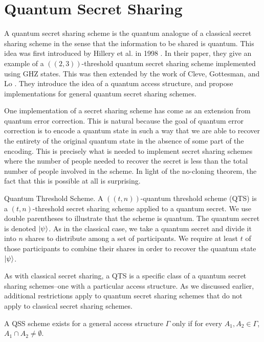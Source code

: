 \section{Quantum Secret Sharing}
\label{section:qss}

A quantum secret sharing scheme is the quantum analogue of a classical secret sharing scheme in the sense that the information to be shared is quantum. This idea was first introduced by Hillery et al. in 1998 \cite{hillery_quantum_1999}. In their paper, they give an example of a $((2,3))$-threshold quantum secret sharing scheme implemented using GHZ states. This was then extended by the work of Cleve, Gottesman, and Lo \cite{cleve_how_1999}. They introduce the idea of a quantum access structure, and propose implementations for general quantum secret sharing schemes.

One implementation of a secret sharing scheme has come as an extension from quantum error correction. This is natural because the goal of quantum error correction is to encode a quantum state in such a way that we are able to recover the entirety of the original quantum state in the absence of some part of the encoding. This is precisely what is needed to implement secret sharing schemes where the number of people needed to recover the secret is less than the total number of people involved in the scheme. In light of the no-cloning theorem, the fact that this is possible at all is surprising. 

\begin{definition}{Quantum Threshold Scheme.}
    \label{defn:qts}
    A $((t,n))$-quantum threshold scheme (QTS) is a $(t,n)$-threshold secret sharing scheme applied to a quantum secret. We use double parentheses to illustrate that the scheme is quantum. The quantum secret is denoted $\ket{\psi}$. As in the classical case, we take a quantum secret and divide it into $n$ shares to distribute among a set of participants. We require at least $t$ of those participants to combine their shares in order to recover the quantum state $\ket{\psi}$.
\end{definition}

As with classical secret sharing, a QTS is a specific class of a quantum secret sharing schemes--one with a particular access structure. As we discussed earlier, additional restrictions apply to quantum secret sharing schemes that do not apply to classical secret sharing schemes.

\begin{theorem}
    \label{thm:qss-disjoint}
    A QSS scheme exists for a general access structure $\Gamma$ only if for every $A_1, A_2 \in \Gamma$, $A_1 \cap A_2 \neq \emptyset$.
\end{theorem}

